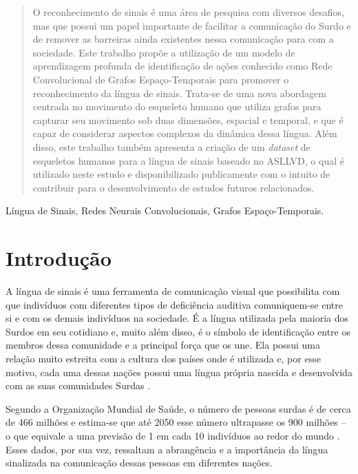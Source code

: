 


\maketitle
\begin{abstract}
O reconhecimento de sinais é uma área de pesquisa com diversos desafios, mas que possui um papel importante de facilitar a comunicação do Surdo e de remover as barreiras ainda existentes nessa comunicação para com a sociedade. Este trabalho propõe a utilização de um modelo de aprendizagem profunda de identificação de ações conhecido como Rede Convolucional de Grafos Espaço-Temporais para promover o reconhecimento da língua de sinais. Trata-se de uma nova abordagem centrada no movimento do esqueleto humano que utiliza grafos para capturar seu movimento sob duas dimensões, espacial e temporal, e que é capaz de considerar aspectos complexos da dinâmica dessa língua. Além disso, este trabalho também apresenta a criação de um \textit{dataset} de esqueletos humanos para a língua de sinais baseado no ASLLVD, o qual é utilizado neste estudo e disponibilizado publicamente com o intuito de contribuir para o desenvolvimento de estudos futuros relacionados.
\end{abstract}

\begin{IEEEkeywords}
Língua de Sinais, Redes Neurais Convolucionais, Grafos Espaço-Temporais.
\end{IEEEkeywords}


\section{Introdução} %
\label{sec:introducao}

A língua de sinais é uma ferramenta de comunicação visual que possibilita com que indivíduos com diferentes tipos de deficiência auditiva comuniquem-se entre si e com os demais indivíduos na sociedade. É a língua utilizada pela maioria dos Surdos em seu cotidiano e, muito além disso, é o símbolo de identificação entre os membros dessa comunidade e a principal força que os une. 
Ela possui uma relação muito estreita com a cultura dos países onde é utilizada e, por esse motivo, cada uma dessas nações possui uma língua própria nascida e desenvolvida com as suas comunidades Surdas \cite{pereira-choi-2011}.

Segundo a Organização Mundial de Saúde, o número de pessoas surdas é de cerca de 466 milhões e estima-se que até 2050 esse número ultrapasse os 900 milhões -- o que equivale a uma previsão de 1 em cada 10 indivíduos ao redor do mundo \cite{who-2018}. Esses dados, por sua vez, ressaltam a abrangência e a importância da língua sinalizada na comunicação dessas pessoas em diferentes nações. 

